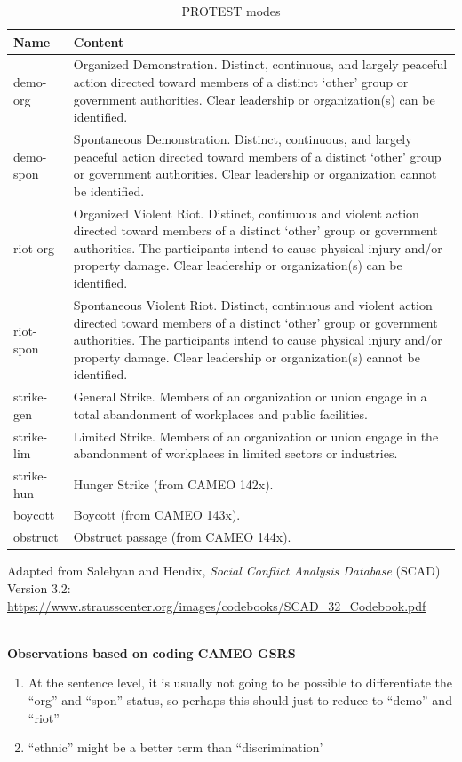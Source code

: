 \documentclass[11pt]{report}
\begin{document}
\begin{table}[htp]
\caption{PROTEST modes}
\begin{center}
\begin{tabular}{|l|p{13cm}|}
\hline
Name & Content \\
\hline
demo-org & Organized Demonstration. Distinct, continuous, and largely peaceful action directed toward
members of a distinct `other' group or government authorities.  Clear leadership or organization(s) can be identified.\\
demo-spon & Spontaneous Demonstration. Distinct, continuous, and largely peaceful action directed
toward members of a distinct `other' group or government authorities. Clear leadership or
organization cannot be identified.\\
riot-org & Organized Violent Riot. Distinct, continuous and violent action directed toward members of
a distinct `other' group or government authorities. The participants intend to cause physical injury and/or
property damage. Clear leadership or organization(s) can be identified.\\
riot-spon & Spontaneous Violent Riot. Distinct, continuous and violent action directed toward members
of a distinct `other' group or government authorities. The participants intend to cause physical injury
and/or property damage. Clear leadership or organization(s) cannot be identified.\\
strike-gen & General Strike. Members of an organization or union engage in a total abandonment of
workplaces and public facilities.\\
strike-lim & Limited Strike. Members of an organization or union engage in the abandonment of
workplaces in limited sectors or industries.\\
strike-hun & Hunger Strike (from CAMEO 142x).\\
boycott & Boycott (from CAMEO 143x).\\
obstruct & Obstruct passage (from CAMEO 144x).\\
\hline
\end{tabular}
\end{center}
\label{tab:protestmode}
\raggedright{Adapted from Salehyan and Hendix, \textit{Social Conflict Analysis Database} (SCAD)
Version 3.2: \url{https://www.strausscenter.org/images/codebooks/SCAD\_32\_Codebook.pdf}}\\~

\textbf{Observations based on coding CAMEO GSRS}
\begin{enumerate}
\item At the sentence level, it is usually not going to be possible to differentiate the ``org'' and ``spon'' status, so perhaps this should just to reduce to ``demo'' and ``riot''
\item ``ethnic'' might be a better term than ``discrimination' 
\end{enumerate}
\end{table}%
\end{document}
